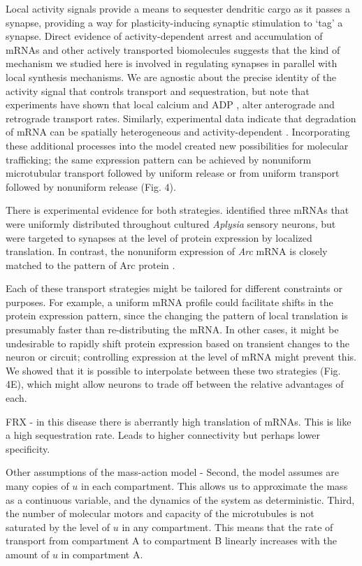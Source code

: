 \documentclass[10pt]{wlpeerj}
\begin{document}
Local activity signals provide a means to sequester dendritic cargo as it passes a synapse, providing a way for plasticity-inducing synaptic stimulation to `tag' a synapse. Direct evidence of activity-dependent arrest \citep{Soundararajan_2014} and accumulation \citep{Krichevsky_2001,Buxbaum_2014a} of mRNAs and other actively transported biomolecules suggests that the kind of mechanism we studied here is involved in regulating synapses in parallel with local synthesis mechanisms. We are agnostic about the precise identity of the activity signal that controls transport and sequestration, but note that experiments have shown that local calcium \citep{Wang_2009} and ADP \citep{Mironov_2007}, alter anterograde and retrograde transport rates. Similarly, experimental data indicate that degradation of mRNA can be spatially heterogeneous and activity-dependent \citep{Farris_2014}. Incorporating these additional processes into the model created new possibilities for molecular trafficking; the same expression pattern can be achieved by nonuniform microtubular transport followed by uniform release or from uniform transport followed by nonuniform release (Fig. 4).

There is experimental evidence for both strategies. \cite{Kim_2015} identified three mRNAs that were uniformly distributed throughout cultured \textit{Aplysia} sensory neurons, but were targeted to synapses at the level of protein expression by localized translation. In contrast, the nonuniform expression of \textit{Arc} mRNA is closely matched to the pattern of Arc protein \citep{Farris_2014, Steward_2015}. 

Each of these transport strategies might be tailored for different constraints or purposes. For example, a uniform mRNA profile could facilitate shifts in the protein expression pattern, since the changing the pattern of local translation is presumably faster than re-distributing the mRNA. In other cases, it might be undesirable to rapidly shift protein expression based on transient changes to the neuron or circuit; controlling expression at the level of mRNA might prevent this. We showed that it is possible to interpolate between these two strategies (Fig. 4E), which might allow neurons to trade off between the relative advantages of each.

FRX - in this disease there is aberrantly high translation of mRNAs. This is like a high sequestration rate. Leads to higher connectivity but perhaps lower specificity.

Other assumptions of the mass-action model - Second, the model assumes are many copies of $u$ in each compartment. This allows us to approximate the mass as a continuous variable, and the dynamics of the system as deterministic. Third, the number of molecular motors and capacity of the microtubules is not saturated by the level of $u$ in any compartment. This means that the rate of transport from compartment A to compartment B linearly increases with the amount of $u$ in compartment A.
\end{document}
